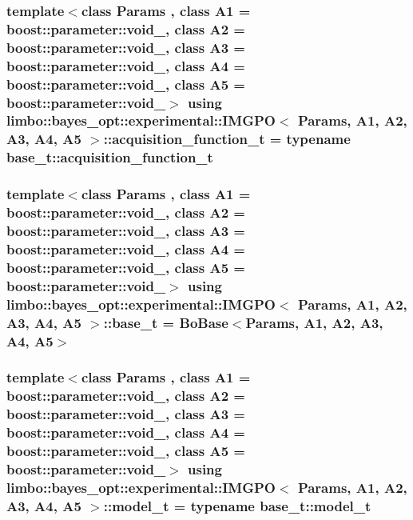\subsubsection[{acquisition\+\_\+function\+\_\+t}]{\setlength{\rightskip}{0pt plus 5cm}template$<$class Params , class A1  = boost\+::parameter\+::void\+\_\+, class A2  = boost\+::parameter\+::void\+\_\+, class A3  = boost\+::parameter\+::void\+\_\+, class A4  = boost\+::parameter\+::void\+\_\+, class A5  = boost\+::parameter\+::void\+\_\+$>$ using {\bf limbo\+::bayes\+\_\+opt\+::experimental\+::\+I\+M\+G\+P\+O}$<$ Params, A1, A2, A3, A4, A5 $>$\+::{\bf acquisition\+\_\+function\+\_\+t} =  typename {\bf base\+\_\+t\+::acquisition\+\_\+function\+\_\+t}}\label{classlimbo_1_1bayes__opt_1_1experimental_1_1_i_m_g_p_o_a794770d90f1ddd8efde68bad804ee5e7}
\hypertarget{classlimbo_1_1bayes__opt_1_1experimental_1_1_i_m_g_p_o_a503aab1180ed196b4cdb35befa9b741e}{}
\subsubsection[{base\+\_\+t}]{\setlength{\rightskip}{0pt plus 5cm}template$<$class Params , class A1  = boost\+::parameter\+::void\+\_\+, class A2  = boost\+::parameter\+::void\+\_\+, class A3  = boost\+::parameter\+::void\+\_\+, class A4  = boost\+::parameter\+::void\+\_\+, class A5  = boost\+::parameter\+::void\+\_\+$>$ using {\bf limbo\+::bayes\+\_\+opt\+::experimental\+::\+I\+M\+G\+P\+O}$<$ Params, A1, A2, A3, A4, A5 $>$\+::{\bf base\+\_\+t} =  {\bf Bo\+Base}$<$Params, A1, A2, A3, A4, A5$>$}\label{classlimbo_1_1bayes__opt_1_1experimental_1_1_i_m_g_p_o_a503aab1180ed196b4cdb35befa9b741e}
\hypertarget{classlimbo_1_1bayes__opt_1_1experimental_1_1_i_m_g_p_o_ae1e0602bec9e133b40e2c171fca8d8de}{}
\subsubsection[{model\+\_\+t}]{\setlength{\rightskip}{0pt plus 5cm}template$<$class Params , class A1  = boost\+::parameter\+::void\+\_\+, class A2  = boost\+::parameter\+::void\+\_\+, class A3  = boost\+::parameter\+::void\+\_\+, class A4  = boost\+::parameter\+::void\+\_\+, class A5  = boost\+::parameter\+::void\+\_\+$>$ using {\bf limbo\+::bayes\+\_\+opt\+::experimental\+::\+I\+M\+G\+P\+O}$<$ Params, A1, A2, A3, A4, A5 $>$\+::{\bf model\+\_\+t} =  typename {\bf base\+\_\+t\+::model\+\_\+t}}\label{classlimbo_1_1bayes__opt_1_1experimental_1_1_i_m_g_p_o_ae1e0602bec9e133b40e2c171fca8d8de}


